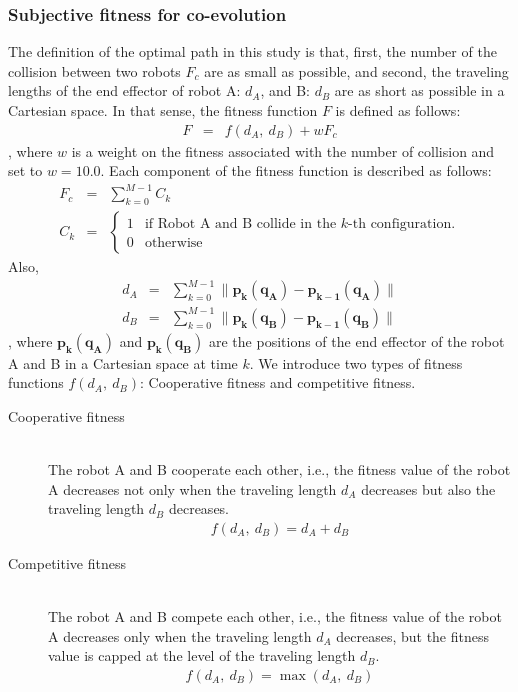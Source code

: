 \documentclass[12pt]{article} %
\begin{document}
\subsubsection{Subjective fitness for co-evolution}
The definition of the optimal path in this study is that, first, the number of the collision between two robots $F_c$ are as small as possible, and second, the traveling lengths of the end effector of robot A: $d_{A}$, and B: $d_{B}$ are as short as possible in a Cartesian space. In that sense, the fitness function $F$ is defined as follows:
\begin{eqnarray}
F &=& f \left( d_{A},~ d_{B} \right) + w F_c
\end{eqnarray}
, where $w$ is a weight on the fitness associated with the number of collision and set to $w=10.0$. Each component of the fitness function is described as follows:
\begin{eqnarray}
F_c &=& \sum_{k=0}^{M-1} C_k \\
C_k &=& \left\{
\begin{array}{cc}
1 & \text{if Robot A and B collide in the $k$-th configuration.}\\
0 & \text{otherwise}
\end{array}
\right.
\end{eqnarray}
Also,
\begin{eqnarray}
d_{A} &=& \sum_{k=0}^{M-1} 
\|  
\bm{p_k}     \left(\bm{q_A} \right) - 
\bm{p_{k-1}} \left(\bm{q_A} \right) 
\| \\
d_{B} &=& \sum_{k=0}^{M-1} 
\|  
\bm{p_k}     \left(\bm{q_B} \right) - 
\bm{p_{k-1}} \left(\bm{q_B} \right) 
\|
\end{eqnarray}
, where $\bm{p_k} \left(\bm{q_A} \right)$ and $\bm{p_k} \left(\bm{q_B} \right)$ are the positions of the end effector of the robot A and B in a Cartesian space at time $k$. We introduce two types of fitness functions $f \left( d_{A},~ d_{B} \right)$: Cooperative fitness and competitive fitness.
\begin{description}
\item[Cooperative fitness] \hfill \\
The robot A and B cooperate each other, i.e., the fitness value of the robot A decreases not only when the traveling length $d_A$ decreases but also the traveling length $d_B$ decreases.
\begin{eqnarray}
f \left( d_{A},~d_{B} \right) = d_{A} + d_{B} 
\end{eqnarray}
\item[Competitive fitness] \hfill \\
The robot A and B compete each other, i.e., the fitness value of the robot A decreases only when the traveling length $d_A$ decreases, but the fitness value is capped at the level of the traveling length $d_B$.
\begin{eqnarray}
f \left( d_{A},~d_{B} \right) = \max \left( d_{A} ,~ d_{B} \right) 
\end{eqnarray}
\end{description}
\end{document}
